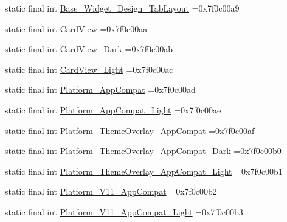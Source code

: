 \begin{DoxyCompactItemize}
\item 
static final int \mbox{\hyperlink{classbr_1_1unb_1_1cic_1_1mp_1_1marketmaster_1_1test_1_1R_1_1style_ae3c636fcf43c761930d8a0ae78cbbd9f}{Base\+\_\+\+Widget\+\_\+\+Design\+\_\+\+Tab\+Layout}} =0x7f0c00a9
\item 
static final int \mbox{\hyperlink{classbr_1_1unb_1_1cic_1_1mp_1_1marketmaster_1_1test_1_1R_1_1style_a13253e1cdeae10e83ebc2af0fd3df776}{Card\+View}} =0x7f0c00aa
\item 
static final int \mbox{\hyperlink{classbr_1_1unb_1_1cic_1_1mp_1_1marketmaster_1_1test_1_1R_1_1style_a0910c3dd09255b4377f2601944d29904}{Card\+View\+\_\+\+Dark}} =0x7f0c00ab
\item 
static final int \mbox{\hyperlink{classbr_1_1unb_1_1cic_1_1mp_1_1marketmaster_1_1test_1_1R_1_1style_a107cbaf4cc7f3eda7ee2f0dfa0cf6767}{Card\+View\+\_\+\+Light}} =0x7f0c00ac
\item 
static final int \mbox{\hyperlink{classbr_1_1unb_1_1cic_1_1mp_1_1marketmaster_1_1test_1_1R_1_1style_a3b38a9a2f94638f1b92a7fd34239ad05}{Platform\+\_\+\+App\+Compat}} =0x7f0c00ad
\item 
static final int \mbox{\hyperlink{classbr_1_1unb_1_1cic_1_1mp_1_1marketmaster_1_1test_1_1R_1_1style_a4ef54bd728c5685c8b0eecd87aa0a3e1}{Platform\+\_\+\+App\+Compat\+\_\+\+Light}} =0x7f0c00ae
\item 
static final int \mbox{\hyperlink{classbr_1_1unb_1_1cic_1_1mp_1_1marketmaster_1_1test_1_1R_1_1style_a0d23b212e95f5d95ae09cd43e9a3954e}{Platform\+\_\+\+Theme\+Overlay\+\_\+\+App\+Compat}} =0x7f0c00af
\item 
static final int \mbox{\hyperlink{classbr_1_1unb_1_1cic_1_1mp_1_1marketmaster_1_1test_1_1R_1_1style_ab826a91b54290717b0ca677e15409bb4}{Platform\+\_\+\+Theme\+Overlay\+\_\+\+App\+Compat\+\_\+\+Dark}} =0x7f0c00b0
\item 
static final int \mbox{\hyperlink{classbr_1_1unb_1_1cic_1_1mp_1_1marketmaster_1_1test_1_1R_1_1style_a702ef8169fde561c0735fb25cf5537c0}{Platform\+\_\+\+Theme\+Overlay\+\_\+\+App\+Compat\+\_\+\+Light}} =0x7f0c00b1
\item 
static final int \mbox{\hyperlink{classbr_1_1unb_1_1cic_1_1mp_1_1marketmaster_1_1test_1_1R_1_1style_a65aa8c3c571b91fdb7a0e5ce47b0e274}{Platform\+\_\+\+V11\+\_\+\+App\+Compat}} =0x7f0c00b2
\item 
static final int \mbox{\hyperlink{classbr_1_1unb_1_1cic_1_1mp_1_1marketmaster_1_1test_1_1R_1_1style_a124b11d65fa18ba02ae54a077472d36e}{Platform\+\_\+\+V11\+\_\+\+App\+Compat\+\_\+\+Light}} =0x7f0c00b3

\end{DoxyCompactItemize}

